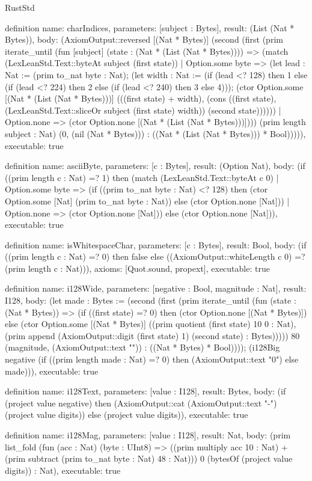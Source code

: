 \begin{lexlean}{RustStd}
\begin{semanticmodule}
definition{
  name: charIndices,
  parameters: [subject : Bytes],
  result: (List (Nat * Bytes)),
  body: (AxiomOutput::reversed [(Nat * Bytes)] (second (first (prim iterate_until (fun [subject] (state : (Nat * (List (Nat * Bytes)))) => (match (LexLeanStd.Text::byteAt subject (first state)) | Option.some byte => (let lead : Nat := (prim to_nat byte : Nat); (let width : Nat := (if (lead <? 128) then 1 else (if (lead <? 224) then 2 else (if (lead <? 240) then 3 else 4))); (ctor Option.some [(Nat * (List (Nat * Bytes)))] (((first state) + width), (cons ((first state), (LexLeanStd.Text::sliceOr subject (first state) width)) (second state)))))) | Option.none => (ctor Option.none [(Nat * (List (Nat * Bytes)))]))) (prim length subject : Nat) (0, (nil (Nat * Bytes))) : ((Nat * (List (Nat * Bytes))) * Bool))))),
  executable: true
}

definition{
  name: asciiByte,
  parameters: [c : Bytes],
  result: (Option Nat),
  body: (if ((prim length c : Nat) =? 1) then (match (LexLeanStd.Text::byteAt c 0) | Option.some byte => (if ((prim to_nat byte : Nat) <? 128) then (ctor Option.some [Nat] (prim to_nat byte : Nat)) else (ctor Option.none [Nat])) | Option.none => (ctor Option.none [Nat])) else (ctor Option.none [Nat])),
  executable: true
}

definition{
  name: isWhitespaceChar,
  parameters: [c : Bytes],
  result: Bool,
  body: (if ((prim length c : Nat) =? 0) then false else ((AxiomOutput::whiteLength c 0) =? (prim length c : Nat))),
  axioms: [Quot.sound, propext],
  executable: true
}

definition{
  name: i128Wide,
  parameters: [negative : Bool, magnitude : Nat],
  result: I128,
  body: (let made : Bytes := (second (first (prim iterate_until (fun (state : (Nat * Bytes)) => (if ((first state) =? 0) then (ctor Option.none [(Nat * Bytes)]) else (ctor Option.some [(Nat * Bytes)] ((prim quotient (first state) 10 0 : Nat), (prim append (AxiomOutput::digit (first state) 1) (second state) : Bytes))))) 80 (magnitude, (AxiomOutput::text "")) : ((Nat * Bytes) * Bool)))); (i128Big negative (if ((prim length made : Nat) =? 0) then (AxiomOutput::text "0") else made))),
  executable: true
}

definition{
  name: i128Text,
  parameters: [value : I128],
  result: Bytes,
  body: (if (project value negative) then (AxiomOutput::cat (AxiomOutput::text "-") (project value digits)) else (project value digits)),
  executable: true
}

definition{
  name: i128Mag,
  parameters: [value : I128],
  result: Nat,
  body: (prim list_fold (fun (acc : Nat) (byte : UInt8) => ((prim multiply acc 10 : Nat) + (prim subtract (prim to_nat byte : Nat) 48 : Nat))) 0 (bytesOf (project value digits)) : Nat),
  executable: true
}


\end{semanticmodule}
\end{lexlean}
